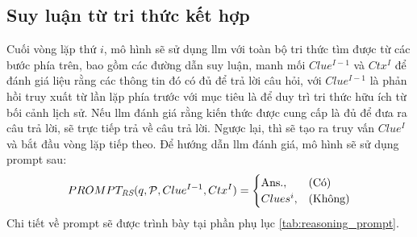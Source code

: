 \subsection{Suy luận từ tri thức kết hợp}
\label{subsection:integrated_reasoning_from_knowledge}
Cuối vòng lặp thứ $i$, mô hình sẽ sử dụng \gls{llm} với toàn bộ tri thức tìm được từ các bước phía trên, bao gồm các đường dẫn suy luận, manh mối $Clue^{I-1}$ và $Ctx^I$ để đánh giá liệu rằng các thông tin đó có đủ để trả lời câu hỏi, với $Clue^{I-1}$ là phản hồi truy xuất từ lần lặp phía trước với mục tiêu là để duy trì tri thức hữu ích từ bối cảnh lịch sử. Nếu \gls{llm} đánh giá rằng kiến thức được cung cấp là đủ để đưa ra câu trả lời, sẽ trực tiếp trả về câu trả lời. Ngược lại, thì sẽ tạo ra truy vấn $Clue^{I}$ và bắt đầu vòng lặp tiếp theo. Để hướng dẫn \gls{llm} đánh giá, mô hình sẽ sử dụng prompt sau:
\begin{equation}
    PROMPT_\emph{RS}(q, \mathcal{P}, Clue^{I-1}, Ctx^I) =
    \begin{cases}
        \text{Ans.}, & \text{(Có)}    \\
        Clues^i,     & \text{(Không)}
    \end{cases}
    \label{eq:9}
\end{equation}
Chi tiết về prompt sẽ được trình bày tại phần phụ lục \ref{tab:reasoning_prompt}.
